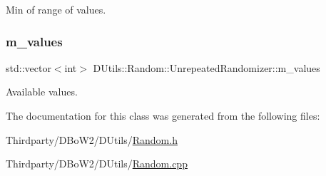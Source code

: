 Min of range of values. 

\mbox{\label{class_d_utils_1_1_random_1_1_unrepeated_randomizer_adbe23146bfc61994e361d356282ce6c4}} 
\subsubsection{\texorpdfstring{m\+\_\+values}{m\_values}}
{\footnotesize\ttfamily std\+::vector$<$int$>$ D\+Utils\+::\+Random\+::\+Unrepeated\+Randomizer\+::m\+\_\+values\hspace{0.3cm}{\ttfamily [protected]}}



Available values. 



The documentation for this class was generated from the following files\+:\begin{DoxyCompactItemize}
\item 
Thirdparty/\+D\+Bo\+W2/\+D\+Utils/\mbox{\hyperlink{_random_8h}{Random.\+h}}\item 
Thirdparty/\+D\+Bo\+W2/\+D\+Utils/\mbox{\hyperlink{_random_8cpp}{Random.\+cpp}}\end{DoxyCompactItemize}
